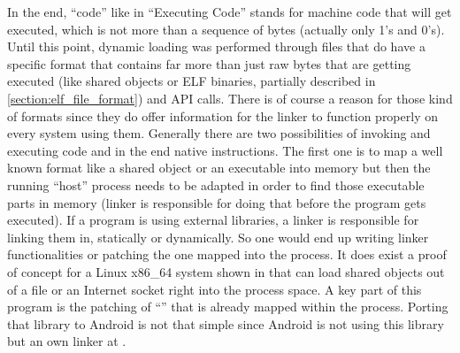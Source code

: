 In the end, ``code'' like in ``Executing Code'' stands for machine code that will get executed, which is not more than a sequence of bytes (actually only 1's and 0's).
Until this point, dynamic loading was performed through files that do have a specific format that contains far more than just raw bytes that are getting
executed (like shared objects or ELF binaries, partially described in
\autoref{section:elf_file_format}) and API calls.
There is of course a reason for those kind of formats since they do offer information for the linker to function properly on every system using them.
Generally there are two possibilities of invoking and executing
code and in the end native instructions.
The first one is to map a well known format like a shared object or an executable
into memory but then the running ``host'' process needs to be adapted in order to find those executable parts in memory (linker is responsible for doing that before the program gets executed).
If a program is using external libraries, a linker is responsible for linking them in, statically or dynamically. So one would end up writing linker
functionalities or patching the one mapped into the process. It does exist a proof of concept for a Linux x86\_64 system shown in \parencite{memdlopen} that can load
shared objects out of a file or an Internet socket right into the process space.
A key part of this program is the patching of ``'' that is already mapped within the process. Porting that library to Android is not that simple since Android is not using this library but an own linker at .

